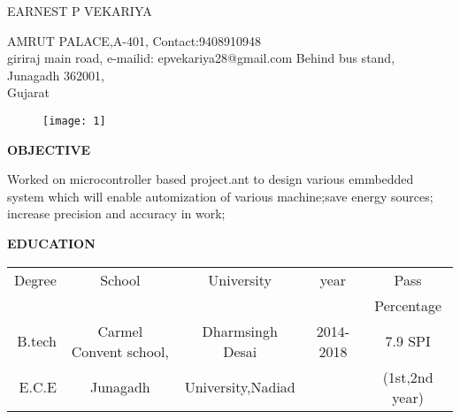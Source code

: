 \documentclass{article}
\begin{document}
 \begin{center}
 	 {
 	 	\large { EARNEST P VEKARIYA}
 	 }
 	
 \end{center}
   \hline
 \begin{flushleft}
 	AMRUT PALACE,A-401, 		\hspace{2.3in}    		    Contact:9408910948             \\
 	giriraj main road, 		\hspace{2.8in}		    	e-mailid: epvekariya28@gmail.com
 	Behind bus stand, \\
	Junagadh 362001,     \\
 	Gujarat       \\
 \end{flushleft}
 \vspace{-0.3in}



 \begin{figure}[h]
    \hspace{4.4in}
	\texttt{[image: 1]}
 \end{figure}
 
 
  \begin{flushleft}
  	\textbf{OBJECTIVE}
  	
  	\vspace{-0.20in}
  	\hspace{1.5in}
  	Worked on microcontroller based project.ant to design various emmbedded system which will enable automization of various machine;save energy sources; increase precision and accuracy in work;
  \end{flushleft}
  
   \begin{flushleft}
   	\textbf{EDUCATION}
   	\hspace{0.45in}
   	\begin{tabular}{|r|c|c|c|c|}
   		\hline
   		Degree & School & University &  year & Pass   \\
   		&        &            &              & Percentage\\
   		\hline
   		
   		B.tech & Carmel Convent school, & Dharmsingh Desai & 2014-2018 &7.9 SPI\\
   		E.C.E	&Junagadh & University,Nadiad& &(1st,2nd year) \\
   		\hline
   	\end{tabular}
   \end{flushleft}
 
\end{document}
